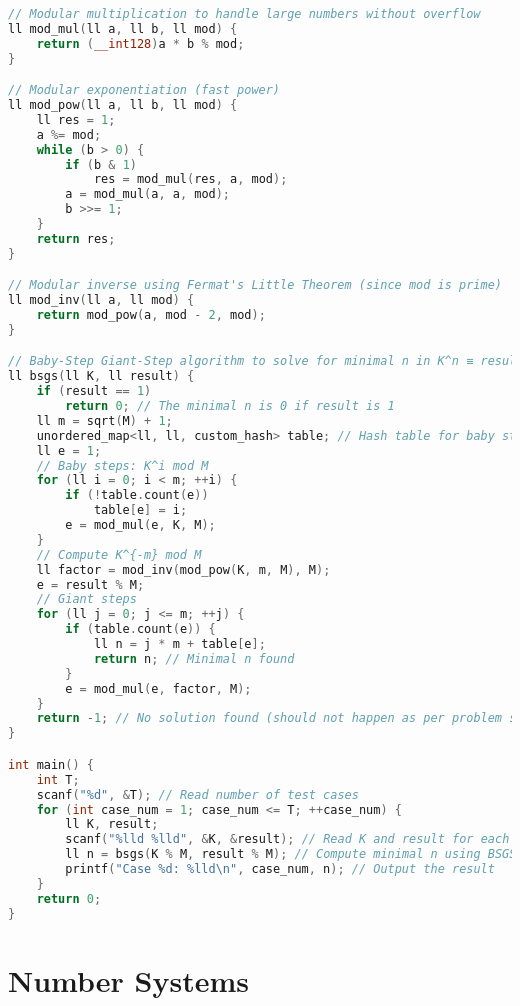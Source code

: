 \documentclass[10pt,a4paper]{article}
\begin{document}
\begin{itemize}
\begin{lstlisting}[language=C++, caption={Distributing Chocolates}, label={1st:code}, mathescape=true, breaklines=true]
// Modular multiplication to handle large numbers without overflow
ll mod_mul(ll a, ll b, ll mod) {
    return (__int128)a * b % mod;
}

// Modular exponentiation (fast power)
ll mod_pow(ll a, ll b, ll mod) {
    ll res = 1;
    a %= mod;
    while (b > 0) {
        if (b & 1)
            res = mod_mul(res, a, mod);
        a = mod_mul(a, a, mod);
        b >>= 1;
    }
    return res;
}

// Modular inverse using Fermat's Little Theorem (since mod is prime)
ll mod_inv(ll a, ll mod) {
    return mod_pow(a, mod - 2, mod);
}

// Baby-Step Giant-Step algorithm to solve for minimal n in K^n ≡ result (mod M)
ll bsgs(ll K, ll result) {
    if (result == 1)
        return 0; // The minimal n is 0 if result is 1
    ll m = sqrt(M) + 1;
    unordered_map<ll, ll, custom_hash> table; // Hash table for baby steps
    ll e = 1;
    // Baby steps: K^i mod M
    for (ll i = 0; i < m; ++i) {
        if (!table.count(e))
            table[e] = i;
        e = mod_mul(e, K, M);
    }
    // Compute K^{-m} mod M
    ll factor = mod_inv(mod_pow(K, m, M), M);
    e = result % M;
    // Giant steps
    for (ll j = 0; j <= m; ++j) {
        if (table.count(e)) {
            ll n = j * m + table[e];
            return n; // Minimal n found
        }
        e = mod_mul(e, factor, M);
    }
    return -1; // No solution found (should not happen as per problem statement)
}

int main() {
    int T;
    scanf("%d", &T); // Read number of test cases
    for (int case_num = 1; case_num <= T; ++case_num) {
        ll K, result;
        scanf("%lld %lld", &K, &result); // Read K and result for each test case
        ll n = bsgs(K % M, result % M); // Compute minimal n using BSGS algorithm
        printf("Case %d: %lld\n", case_num, n); // Output the result
    }
    return 0;
}

\end{lstlisting}


\section{Number Systems}

\end{itemize}
\end{document}
